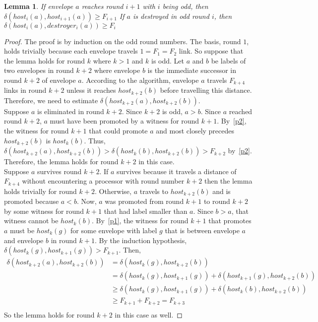 \documentclass{article}
\newtheorem{lemma}{Lemma}
\begin{document}
\begin{lemma}\label{p3}
    If envelope $a$ reaches round $i+1$ with $i$ being odd, then $\delta(host_i(a), host_{i+1}(a)) \geq F_{i+1}$
    If $a$ is destroyed in odd round $i$, then $\delta(host_i(a), destroyer_i(a)) \geq F_i$
\end{lemma}
\begin{proof}
    The proof is by induction on the odd round numbers. The basis, round $1$, holds trivially because each envelope travels $1 = F_1 = F_2$ link. So suppose that the lemma holds for round $k$ where $k > 1$ and $k$ is odd. Let $a$ and $b$ be labels of two envelopes in round $k + 2$ where envelope $b$ is the immediate successor in round $k + 2$ of envelope $a$. According to the algorithm, envelope $a$ travels $F_{k+4}$ links in round $k + 2$ unless it reaches $host_{k+2}(b)$ before travelling this distance. Therefore, we need to estimate $\delta(host_{k+2}(a), host_{k+2}(b))$.
    \\
    Suppose $a$ is eliminated in round $k+2$. Since $k+2$ is odd, $a > b$. Since $a$ reached round $k + 2$, $a$ must have been promoted by a witness for round $k + 1$. By~\cref{p2}, the witness for round $k+1$ that could promote $a$ and most closely precedes $host_{k+2}(b)$ is $host_k(b)$. Thus, $\delta(host_{k+2}(a), host_{k+2}(b)) > \delta(host_k(b), host_{k+2}(b)) > F_{k+2}$ by~\cref{p2}. Therefore, the lemma holds for round $k + 2$ in this case.
    \\
    Suppose $a$ survives round $k + 2$. If $a$ survives because it travels a distance of $F_{k+4}$ without encountering a processor with round number $k + 2$ then the lemma holds trivially for round $k + 2$. Otherwise, $a$ travels to $host_{k+2}(b)$ and is promoted because $a < b$. Now, $a$ was promoted from round $k + 1$ to round $k + 2$ by some witness for round $k + 1$ that had label smaller than $a$. Since $b > a$, that witness cannot be $host_k(b)$. By~\cref{p1}, the witness for round $k + 1$ that promotes $a$ must be $host_k(g)$ for some envelope with label $g$ that is between envelope $a$ and envelope $b$ in round $k + 1$. By the induction hypothesis, $\delta(host_k(g), host_{k+1}(g)) > F_{k+1}$. Then, 
\[
\begin{aligned}    
    \delta(host_{k+2}(a), host_{k+2}(b)) & =    \delta(host_k(g), host_{k+2}(b)) \\
                                         & =    \delta(host_k(g), host_{k+1}(g)) + \delta(host_{k+1}(g), host_{k+2}(b)) \\
                                         & \geq \delta(host_k(g), host_{k+1}(g)) + \delta(host_k(b), host_{k+2}(b)) \\
                                         & \geq F_{k+1} + F_{k+2} = F_{k+3} \\
\end{aligned}
\]
    So the lemma holds for round $k + 2$ in this case as well.
\end{proof}
\end{document}
